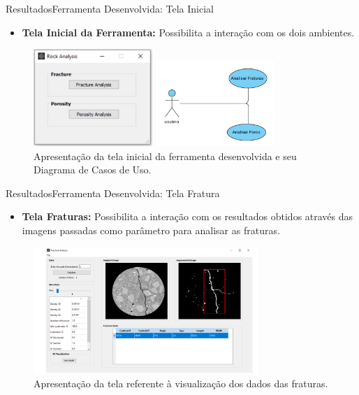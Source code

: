 \documentclass{beamer}
\begin{document}
\begin{frame}{Resultados}{Ferramenta Desenvolvida: Tela Inicial}
    \begin{itemize}
        \item \textbf{Tela Inicial da Ferramenta:} Possibilita a interação com os dois ambientes.
    \end{itemize}
    
    \begin{figure}[!htb]
    \centering
    \includegraphics[width=4.5cm]{fig/tela_inicial.pdf}\hspace*{0.1cm}
    \includegraphics[width=4.5cm]{fig/casos-1.PNG}\\
    \scriptsize{Apresentação da tela inicial da ferramenta desenvolvida e seu Diagrama de Casos de Uso.}
    \label{fig:tela_inicial}
    \end{figure}
\end{frame}


\begin{frame}{Resultados}{Ferramenta Desenvolvida: Tela Fratura}
    \begin{itemize}
        \item \textbf{Tela Fraturas:} Possibilita a interação com os resultados obtidos através das imagens passadas como parâmetro para analisar as fraturas.
    \end{itemize}
    
        
    \begin{figure}[!htb]
    \centering
    \includegraphics[width=8.5cm]{fig/tela-fracture.pdf}\\
    \scriptsize{Apresentação da tela referente à visualização dos dados das fraturas.}
    \end{figure}
\end{frame}
\end{document}
